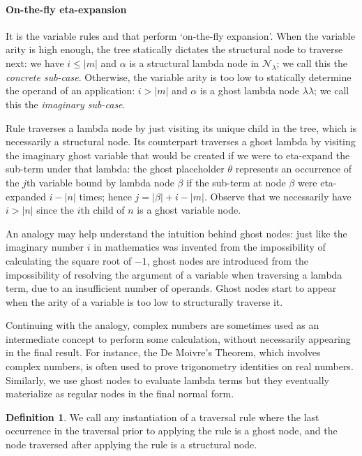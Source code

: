 \documentclass{elsarticle}
\theoremstyle{plain}
\theoremstyle{definition}
\newtheorem{definition}{Definition}[section]
\theoremstyle{remark}
\newcommand\Nodes{\mathcal{N}}%
\newcommand\NodesLmd{\Nodes_\lambda}%
\newcommand{\ghostlmd}{{\lambda\!\!\lambda}}
\newcommand{\ghostvar}{\theta}
\newcommand{\ExternalNodes}{\Nodes^{\sf ext}}
\begin{document}


\paragraph{On-the-fly eta-expansion}
It is the variable rules  and  that perform `on-the-fly expansion'. When the variable arity is high enough, the tree statically dictates the structural node to traverse next: we have $i \leq |m|$ and $\alpha$ is a structural lambda node in $\NodesLmd$; we call this the \emph{concrete sub-case}. Otherwise, the variable arity is too low to statically determine the operand of an application: $i > |m|$ and $\alpha$ is a ghost lambda node $\ghostlmd$; we call this the \emph{imaginary sub-case}.

Rule  traverses a lambda node by just visiting its unique child  in the tree, which is necessarily a structural node. Its counterpart \rulenamet{Lam^\ghostvar} traverses a ghost lambda by visiting the imaginary ghost variable that would be created if we were to eta-expand the sub-term under that lambda: the ghost placeholder $\ghostvar$ represents an occurrence of the $j$th variable bound by lambda node $\beta$ if the sub-term at node $\beta$ were eta-expanded $i-|n|$ times; hence $j = |\beta| + i - |m|$.
Observe that we necessarily have $i>|n|$ since the $i$th child of $n$ is a ghost variable node.

An analogy may help understand the intuition behind ghost nodes:
just like the imaginary number $i$ in mathematics was invented from the impossibility of calculating the square root of $-1$, ghost nodes are introduced from the impossibility of resolving the argument of a variable when traversing a lambda term, due to an insufficient number of operands. Ghost nodes start to appear when the arity of a variable is too low to structurally traverse it.


Continuing with the analogy, complex numbers are sometimes used as an intermediate concept to perform some calculation, without necessarily appearing in the final result. For instance, the De Moivre's Theorem, which involves complex numbers, is often used to prove trigonometry identities on real numbers. Similarly, we use ghost nodes to evaluate lambda terms but they eventually materialize as regular nodes in the final normal form.

\begin{definition}
We call  any instantiation of a traversal rule where the last occurrence in the traversal prior to applying the rule is a ghost node, and the node traversed after applying the rule is a structural node.
\end{definition}
\end{document}
